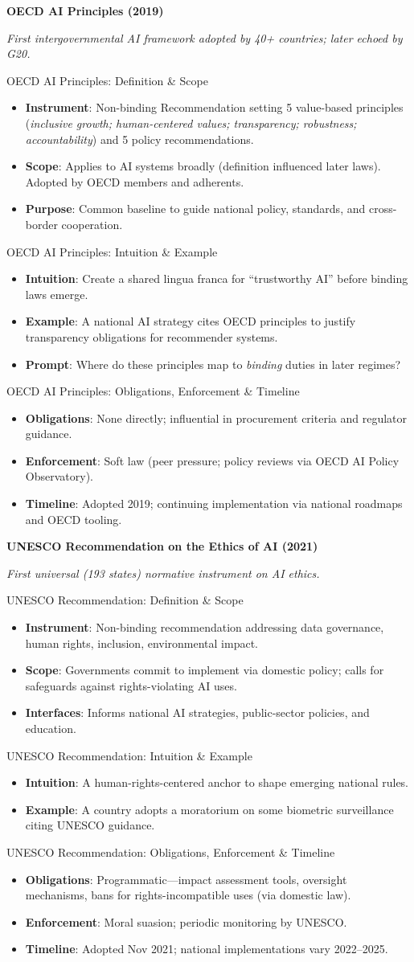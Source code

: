 \documentclass[aspectratio=169]{beamer}
\newcommand{\RegTitle}[2]{%
  \begin{frame}[plain]
    \centering
    \vfill
    {\usebeamerfont{title}\usebeamercolor[fg]{title}\LARGE \textbf{#1}\par}
    \vspace{0.4em}
    {\small \itshape #2\par}
    \vfill
  \end{frame}
}
\newcommand{\RegDef}[2]{%
  \begin{frame}{#1: Definition \& Scope}
    \begin{itemize}
      #2
    \end{itemize}
  \end{frame}
}
\newcommand{\RegIntuition}[2]{%
  \begin{frame}{#1: Intuition \& Example}
    \begin{itemize}
      #2
    \end{itemize}
  \end{frame}
}
\newcommand{\RegCompliance}[2]{%
  \begin{frame}{#1: Obligations, Enforcement \& Timeline}
    \begin{itemize}
      #2
    \end{itemize}
  \end{frame}
}
\begin{document}
\RegTitle{OECD AI Principles (2019)}{First intergovernmental AI framework adopted by 40+ countries; later echoed by G20.}
\RegDef{OECD AI Principles}{%
  \item \textbf{Instrument}: Non-binding Recommendation setting 5 value-based principles (\emph{inclusive growth; human-centered values; transparency; robustness; accountability}) and 5 policy recommendations.
  \item \textbf{Scope}: Applies to AI systems broadly (definition influenced later laws). Adopted by OECD members and adherents.
  \item \textbf{Purpose}: Common baseline to guide national policy, standards, and cross-border cooperation.
}
\RegIntuition{OECD AI Principles}{%
  \item \textbf{Intuition}: Create a shared lingua franca for ``trustworthy AI'' before binding laws emerge.
  \item \textbf{Example}: A national AI strategy cites OECD principles to justify transparency obligations for recommender systems.
  \item \textbf{Prompt}: Where do these principles map to \emph{binding} duties in later regimes?
}
\RegCompliance{OECD AI Principles}{%
  \item \textbf{Obligations}: None directly; influential in procurement criteria and regulator guidance.
  \item \textbf{Enforcement}: Soft law (peer pressure; policy reviews via OECD AI Policy Observatory).
  \item \textbf{Timeline}: Adopted 2019; continuing implementation via national roadmaps and OECD tooling.
}

\RegTitle{UNESCO Recommendation on the Ethics of AI (2021)}{First universal (193 states) normative instrument on AI ethics.}
\RegDef{UNESCO Recommendation}{%
  \item \textbf{Instrument}: Non-binding recommendation addressing data governance, human rights, inclusion, environmental impact.
  \item \textbf{Scope}: Governments commit to implement via domestic policy; calls for safeguards against rights-violating AI uses.
  \item \textbf{Interfaces}: Informs national AI strategies, public-sector policies, and education.
}
\RegIntuition{UNESCO Recommendation}{%
  \item \textbf{Intuition}: A human-rights-centered anchor to shape emerging national rules.
  \item \textbf{Example}: A country adopts a moratorium on some biometric surveillance citing UNESCO guidance.
}
\RegCompliance{UNESCO Recommendation}{%
  \item \textbf{Obligations}: Programmatic—impact assessment tools, oversight mechanisms, bans for rights-incompatible uses (via domestic law).
  \item \textbf{Enforcement}: Moral suasion; periodic monitoring by UNESCO.
  \item \textbf{Timeline}: Adopted Nov 2021; national implementations vary 2022--2025.
}
\end{document}
